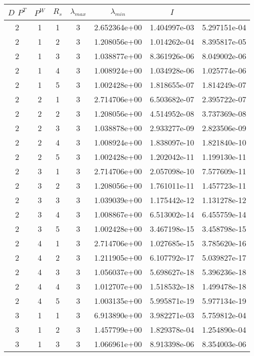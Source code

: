 \documentclass{article}
\begin{document}
\begin{table}
\begin{center}
\begin{tabular}{|cccc|ccc|} \hline
$D$ $P^T$  & $P^W$ & $R_s$ & $\lambda_{max}$ & $\lambda_{min}$   & $I$ \\
  \hline
2 & 1 & 1 & 3 & 2.652364e+00 & 1.404997e-03 & 5.297151e-04 \\ 
2 & 1 & 2 & 3 & 1.208056e+00 & 1.014262e-04 & 8.395817e-05 \\ 
2 & 1 & 3 & 3 & 1.038877e+00 & 8.361926e-06 & 8.049002e-06 \\ 
2 & 1 & 4 & 3 & 1.008924e+00 & 1.034928e-06 & 1.025774e-06 \\ 
2 & 1 & 5 & 3 & 1.002428e+00 & 1.818655e-07 & 1.814249e-07 \\ 
2 & 2 & 1 & 3 & 2.714706e+00 & 6.503682e-07 & 2.395722e-07 \\ 
2 & 2 & 2 & 3 & 1.208056e+00 & 4.514952e-08 & 3.737369e-08 \\ 
2 & 2 & 3 & 3 & 1.038878e+00 & 2.933277e-09 & 2.823506e-09 \\ 
2 & 2 & 4 & 3 & 1.008924e+00 & 1.838097e-10 & 1.821840e-10 \\ 
2 & 2 & 5 & 3 & 1.002428e+00 & 1.202042e-11 & 1.199130e-11 \\ 
2 & 3 & 1 & 3 & 2.714706e+00 & 2.057098e-10 & 7.577609e-11 \\ 
2 & 3 & 2 & 3 & 1.208056e+00 & 1.761011e-11 & 1.457723e-11 \\ 
2 & 3 & 3 & 3 & 1.039039e+00 & 1.175442e-12 & 1.131278e-12 \\ 
2 & 3 & 4 & 3 & 1.008867e+00 & 6.513002e-14 & 6.455759e-14 \\ 
2 & 3 & 5 & 3 & 1.002428e+00 & 3.467198e-15 & 3.458798e-15 \\ 
2 & 4 & 1 & 3 & 2.714706e+00 & 1.027685e-15 & 3.785620e-16 \\   
2 & 4 & 2 & 3 & 1.211905e+00 & 6.107792e-17 & 5.039827e-17 \\ 
2 & 4 & 3 & 3 & 1.056037e+00 & 5.698627e-18 & 5.396236e-18 \\ 
2 & 4 & 4 & 3 & 1.012707e+00 & 1.518532e-18 & 1.499478e-18 \\ 
2 & 4 & 5 & 3 & 1.003135e+00 & 5.995871e-19 & 5.977134e-19 \\ 
3 & 1 & 1 & 3 & 6.913890e+00 & 3.982271e-03 & 5.759812e-04 \\ 
3 & 1 & 2 & 3 & 1.457799e+00 & 1.829378e-04 & 1.254890e-04 \\ 
3 & 1 & 3 & 3 & 1.066961e+00 & 8.913398e-06 & 8.354003e-06 \\ 

\end{tabular}
\end{center}
\end{table}
\end{document}
